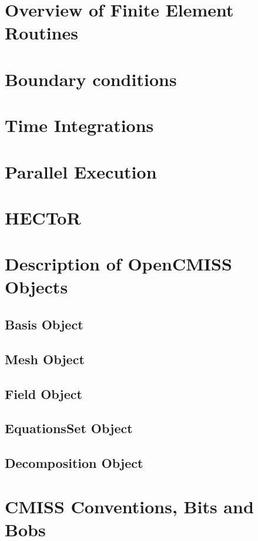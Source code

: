 \section{Overview of Finite Element Routines}
\label{sec:devel_fe_routines}

\section{Boundary conditions}
\label{sec:devel_bc}

\section{Time Integrations}
\label{sec:devel_time_integrations}

\section{Parallel Execution}
\label{sec:devel_parallel}

\section{HECToR}
\label{sec:devel_hector}

\section{Description of OpenCMISS Objects}
\label{sec:devel_objects}

\subsection{Basis Object}
\label{sec:devel_basis}

\subsection{Mesh Object}
\label{sec:devel_mesh}

\subsection{Field Object}
\label{sec:devel_field}

\subsection{EquationsSet Object}
\label{sec:devel_equationsset}

\subsection{Decomposition Object}
\label{sec:devel_decomposition}

\section{CMISS Conventions, Bits and Bobs}
% 

